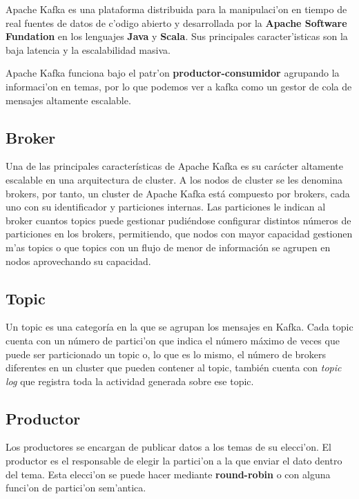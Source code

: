 

Apache Kafka es una plataforma distribuida para la manipulaci'on en tiempo de real fuentes de datos de c'odigo abierto y desarrollada por la \textbf{Apache Software Fundation} en los lenguajes \textbf{Java} y \textbf{Scala}. Sus principales caracter'isticas son la baja latencia y la escalabilidad masiva.


Apache Kafka funciona bajo el patr'on \textbf{productor-consumidor} agrupando la informaci'on en temas, por lo que podemos ver a kafka como un gestor de cola de mensajes altamente escalable.

\subsection{Broker}
Una de las principales características de Apache Kafka es su carácter altamente escalable en una arquitectura de cluster. A los nodos de cluster se les denomina brokers, por tanto, un cluster de Apache Kafka está compuesto por brokers, cada uno con su identificador y particiones internas. 
Las particiones le indican al broker cuantos topics puede gestionar pudiéndose configurar distintos números de particiones en los brokers, permitiendo, que nodos con mayor capacidad gestionen m'as topics o que topics con un flujo de menor de información se agrupen en nodos aprovechando su capacidad.

\subsection{Topic}
Un topic es una categoría en la que se agrupan los mensajes en Kafka. Cada topic cuenta con un número de partici'on que indica el número máximo de veces que puede ser particionado un topic o, lo que es lo mismo, el número de brokers diferentes en un cluster que pueden contener al topic, también cuenta con \textit{topic log} que registra toda la actividad generada sobre ese topic.

\subsection{Productor}
Los productores se encargan de publicar datos a los temas de su elecci'on. El productor es el responsable de elegir la partici'on a la que enviar el dato dentro del tema. Esta elecci'on se puede hacer mediante \textbf{round-robin} o con alguna funci'on de partici'on sem'antica.

